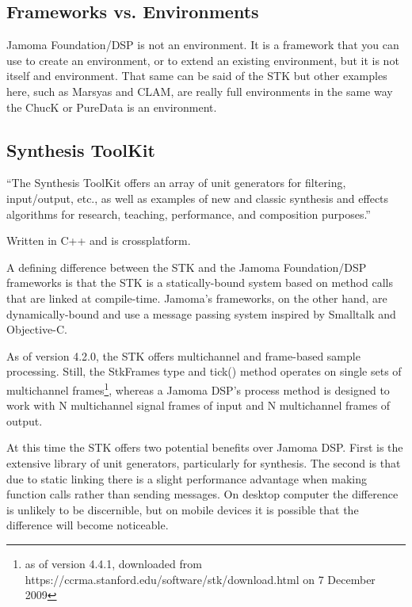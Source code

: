\documentclass[twoside,10pt]{article}
\begin{document}
\subsection {Frameworks vs. Environments}


Jamoma Foundation/DSP is not an environment.  It is a framework that you can use to create an environment, or to extend an existing environment, but it is not itself and environment.  That same can be said of the STK but other examples here, such as Marsyas and CLAM, are really full environments in the same way the ChucK or PureData is an environment.


\subsection{Synthesis ToolKit} %

``The Synthesis ToolKit offers an array of unit generators for filtering, input/output, etc., as well as examples of new and classic synthesis and effects algorithms for research, teaching, performance, and composition purposes.''\cite{Cook:1999}

Written in C++ and is crossplatform.


A defining difference between the STK and the Jamoma Foundation/DSP frameworks is that the STK is a statically-bound system based on method calls that are linked at compile-time.  Jamoma's frameworks, on the other hand, are dynamically-bound and use a message passing system inspired by Smalltalk\cite{Krasner:1988} and Objective-C\cite{Cox:1986}.

As of version 4.2.0, the STK offers multichannel and frame-based sample processing\cite{Scavone:2005}. Still, the StkFrames type and tick() method operates on single sets of multichannel frames\footnote{as of version 4.4.1, downloaded from https://ccrma.stanford.edu/software/stk/download.html on 7 December 2009}, whereas a Jamoma DSP's process method is designed to work with N multichannel signal frames of input and N multichannel frames of output.

At this time the STK offers two potential benefits over Jamoma DSP.  First is the extensive library of unit generators, particularly for synthesis.  The second is that due to static linking there is a slight performance advantage when making function calls rather than sending messages.  On desktop computer the difference is unlikely to be discernible, but on mobile devices it is possible that the difference will become noticeable.
\end{document}
